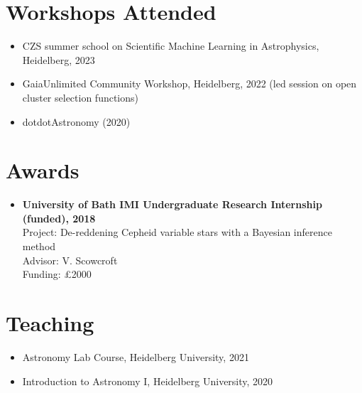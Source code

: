 \documentclass[12pt, letterpaper]{hunt-cv}
\begin{document}
\section*{Workshops Attended}

\begin{itemize}
    \item CZS summer school on Scientific Machine Learning in Astrophysics, Heidelberg, 2023
    \item GaiaUnlimited Community Workshop, Heidelberg, 2022 (led session on open cluster selection functions)
    \item dotdotAstronomy (2020)
\end{itemize}


\section*{Awards}

\begin{itemize}
    \item \textbf{University of Bath IMI Undergraduate Research Internship (funded), 2018}\\
    Project: De-reddening Cepheid variable stars with a Bayesian inference method\\
    Advisor: V. Scowcroft\\
    Funding: £2000
\end{itemize}


\section*{Teaching}

\begin{itemize}
    \item Astronomy Lab Course, Heidelberg University, 2021
    \item Introduction to Astronomy I, Heidelberg University, 2020
\end{itemize}



\end{document}
